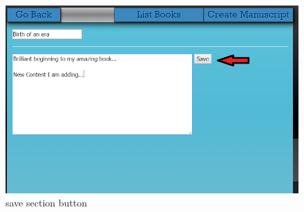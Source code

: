\begin{itemize}
		\begin{figure}[h]
			\centering
			\includegraphics[scale=0.5]{images/saveManuscriptSection.png}
			\caption{save section button}
		\end{figure} 
		
	\end{itemize}